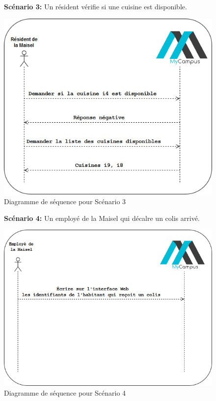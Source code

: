 \documentclass[12pt]{report}
\begin{document}
\begin{figure}[]
\textbf{Scénario 3:}  Un résident vérifie si une cuisine est disponible.
\begin{center}
\includegraphics[scale=0.5]{cuisine.png}
\caption{Diagramme de séquence pour Scénario 3}
\end{center}
\end{figure}


\begin{figure}[]
\textbf{Scénario 4:}  Un employé de la Maisel qui décalre un colis arrivé.
\begin{center}
\includegraphics[scale=0.5]{employemaisel.png}
\caption{Diagramme de séquence pour Scénario 4}
\end{center}
\end{figure}
\end{document}
